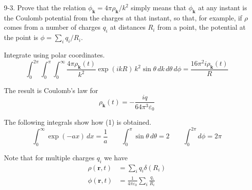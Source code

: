 \documentclass[12pt]{article}
\begin{document}
9-3.
Prove that the relation $\phi_{\mathbf k}=4\pi\rho_{\mathbf k}/k^2$
simply means that $\phi_{\mathbf k}$ at any instant is the Coulomb
potential from the charges at that instant, so that, for example,
if $\rho$ comes from a number of charges $q_i$ at distances $R_i$
from a point, the potential at the point is
$\phi=\sum_iq_i/R_i$.

\bigskip
Integrate using polar coordinates.
\begin{equation*}
\int_0^{2\pi}\int_0^\pi\int_0^\infty
\frac{4\pi\rho_{\mathbf k}(t)}{k^2}\exp(ikR)\,k^2\sin\theta\,dk\,d\theta\,d\phi
=\frac{16\pi^2i\rho_{\mathbf k}(t)}{R}
\tag{1}
\end{equation*}

The result is Coulomb's law for
\begin{equation*}
\rho_{\mathbf k}(t)=-\frac{iq}{64\pi^3\varepsilon_0}
\end{equation*}

The following integrals show how (1) is obtained.
\begin{equation*}
\int_0^\infty\exp(-a x)\,dx=\frac{1}{a}
\qquad
\int_0^\pi\sin\theta\,d\theta=2
\qquad
\int_0^{2\pi}d\phi=2\pi
\end{equation*}

Note that for multiple charges $q_i$ we have
\begin{align*}
\rho(\mathbf r,t)&=\sum_iq_i\delta(R_i)
\\
\phi(\mathbf r,t)&=\frac{1}{4\pi\varepsilon_0}\sum_i\frac{q_i}{R_i}
\end{align*}
\end{document}
